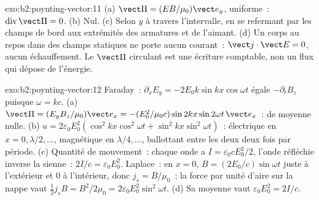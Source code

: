 \begin{solution}{exo:b2:poynting-vector:11}
(a) $\vect\Pi = (EB/\mu_0)\vect e_y$, uniforme~: $\operatorname{div}\vect\Pi = 0$. (b) Nul.
(c) Selon $y$ à travers l'intervalle, en se refermant par les champs de bord aux
extrémités des armatures et de l'aimant. (d) Un corps au repos dans des champs
statiques ne porte aucun courant~: $\vect j\cdot\vect E = 0$, aucun échauffement. Le
$\vect\Pi$ circulant est une écriture comptable, non un flux qui dépose de l'énergie.
\end{solution}

\begin{solution}{exo:b2:poynting-vector:12}
Faraday~: $\partial_xE_y = -2E_0k\sin kx\cos\omega t$ égale $-\partial_tB_z$ puisque
$\omega = kc$. (a)
$\vect\Pi = (E_yB_z/\mu_0)\vect e_x = -(E_0^2/\mu_0c)\sin2kx\sin2\omega t\,\vect e_x$~: de moyenne
nulle. (b) $u = 2\varepsilon_0E_0^2(\cos^2kx\cos^2\omega t + \sin^2kx\sin^2\omega t)$~: électrique
en $x = 0, \lambda/2, \dots$, magnétique en $\lambda/4, \dots$, ballottant entre les deux
deux fois par période. (c) Quantité de mouvement~: chaque onde a $I = \varepsilon_0cE_0^2/2$, l'onde
réfléchie inverse la sienne~: $2I/c = \varepsilon_0E_0^2$. Laplace~: en $x =
0$, $B = (2E_0/c)\sin\omega t$ juste à l'extérieur et $0$ à l'intérieur, donc $j_s = B/\mu_0$~; la
force par unité d'aire sur la nappe vaut $\tfrac12j_sB = B^2/2\mu_0 = 2\varepsilon_0E_0^2\sin^2
\omega t$. (d) Sa moyenne vaut $\varepsilon_0E_0^2 = 2I/c$.
\end{solution}

